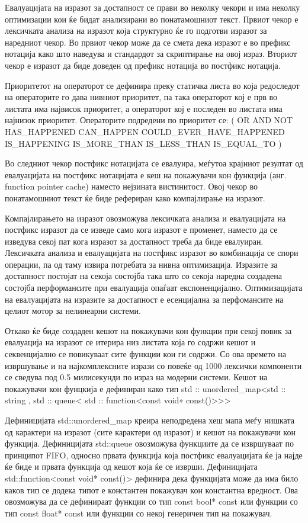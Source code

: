 Евалуацијата на изразот за достапност се прави во неколку чекори и има неколку оптимизации кои ќе бидат анализирани во понатамошниот текст. Првиот чекор е лексичката анализа на изразот која структурно ќе го подготви изразот за наредниот чекор. Во првиот чекор може да се смета дека изразот е во префикс нотација како што наведува и стандардот за скриптирање на овој израз. Вториот чекор е изразот да биде доведен од префикс нотација во постфикс нотација.

Приоритетот на операторот се дефинира преку статичка листа во која редоследот на операторите го дава нивниот приоритет, па така операторот кој е прв во листата има највисок приоритет, а операторот кој е последен во листата има најнизок приоритет. Операторите подредени по приоритет се: ( OR AND NOT HAS\_HAPPENED CAN\_HAPPEN COULD\_EVER\_HAVE\_HAPPENED IS\_HAPPENING IS\_MORE\_THAN IS\_LESS\_THAN IS\_EQUAL\_TO )

Во следниот чекор постфикс нотацијата се евалуира, меѓутоа крајниот резултат од евалуацијата на постфикс нотацијата е кеш на покажувачи кон функција (анг. function pointer cache) наместо нејзината вистинитост. Овој чекор во понатамошниот текст ќе биде рефериран како компајлирање на изразот.

Компајлирањето на изразот овозможува лексичката анализа и евалуацијата на постфикс изразот да се изведе само кога изразот е променет, наместо да се изведува секој пат кога изразот за достапност треба да биде евалуиран. Лексичката анализа и евалуацијата на постфикс изразот во комбинација се спори операции, па од таму извира потребата за нивна оптимизација. Изразите за достапност постојат на секоја состојба така што со секоја наредна создадена состојба перформансите при евалуација опаѓаат експоненцијално. Оптимизацијата на евалуацијата на изразите за достапност е есенцијална за перфомансите на целиот мотор за нелинеарни системи.

Откако ќе биде создаден кешот на покажувачи кон функции при секој повик за евалуација на изразот се итерира низ листата која го содржи кешот и секвенцијално се повикуваат сите функции кои ги содржи. Со ова времето на извршување и на најкомплексните изрази со повеќе од 1000 лексички компоненти се сведува под 0.5 милисекунди по израз на модерни системи. Кешот на покажувачи кон фунцкија е дефиниран како тип std :: unordered\_map<std :: string , std :: queue< std :: function<const void∗ const()>>>

Дефиницијата std::unordered\_map креира неподредена хеш мапа меѓу нишката од карактери на изразот (сите карактери од изразот) и кешот на покажувачи кон функција. Дефиницијата std::queue овозможува функциите да се извршуваат по принципот FIFO, односно првата функција која постфикс евалуацијата ќе ја најде ќе биде и првата функција од кешот која ќе се изврши. Дефиницијата std::function<const void* const()> дефинира дека функцијата може да има било каков тип се додека типот е константен покажувач кон константна вредност. Ова овозможува да се дефинираат функции со тип const bool* const или функции со тип const float* const или функции со некој генеричен тип на покажувач.

